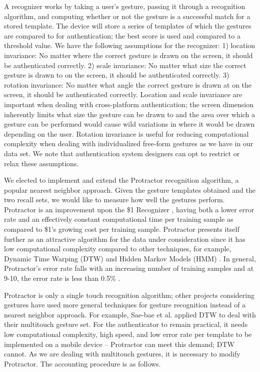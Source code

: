 \documentclass{sig-alternate-10pt}
\begin{document}
A recognizer works by taking a user's gesture,  passing it through a recognition algorithm, and computing whether or not the gesture is a successful match for a stored template. The device will store a series of templates of which the gestures are compared to for authentication; the best score is used and compared to a threshold value. We have the following assumptions for the recognizer: 1) location invariance: No matter where the correct gesture is drawn on the screen, it should be authenticated correctly.  2) scale invariance: No matter what size the correct gesture is drawn to on the screen, it should be authenticated correctly. 3) rotation invariance: No matter what angle the correct gesture is drawn at on the screen, it should be authenticated correctly. Location and scale invariance are important when dealing with cross-platform authentication; the screen dimension inherently limits what size the gesture can be drawn to and the area over which a gesture can be performed would cause wild variations in where it would be drawn depending on the user. Rotation invariance is useful for reducing computational complexity when dealing with individualized free-form gestures as we have in our data set. We note that authentication system designers can opt to restrict or relax these assumptions.







	We elected to implement and extend the Protractor \cite{Li:2010:PFA:1753326.1753654} recognition algorithm, a popular nearest neighbor approach. Given the gesture templates obtained and the two recall sets, we would like to measure how well the gestures perform. Protractor is an improvement upon the \$1 Recognizer \cite{Wobbrock:2007:GWL:1294211.1294238}, having both a lower error rate \cite{Li:2010:PFA:1753326.1753654} and an effectively constant computational time per training sample as compared to \$1's growing cost per training sample. Protractor presents itself further as an attractive algorithm for the data under consideration since it has low computational complexity compared to other techniques, for example, Dynamic Time Warping (DTW) \cite{Wobbrock:2007:GWL:1294211.1294238} and Hidden Markov Models (HMM) \cite{hmm1,hmm2}.  In general, Protractor's error rate falls with an increasing number of training samples and at 9-10, the error rate is less than 0.5\% \cite{Li:2010:PFA:1753326.1753654}. 

	Protractor is only a single touch recognition algorithm; other projects considering gestures have used more general techniques for gesture recognition instead of a nearest neighbor approach. For example, Sae-bae et al. \cite{Sae-Bae:2012:BGN:2207676.2208543} applied DTW to deal with their multitouch gesture set. For the authenticator to remain practical, it needs low computational complexity, high speed,  and low error rate per template to be implemented on a mobile device -- Protractor can meet this demand; DTW cannot. As we are dealing with multitouch gestures, it is necessary to modify Protractor. The accounting procedure is as follows.
	
\end{document}

